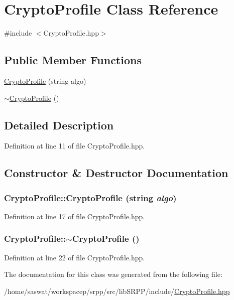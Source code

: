 \hypertarget{class_crypto_profile}{
\section{CryptoProfile Class Reference}
\label{class_crypto_profile}
}


{\ttfamily \#include $<$CryptoProfile.hpp$>$}

\subsection*{Public Member Functions}
\begin{DoxyCompactItemize}
\item 
\hyperlink{class_crypto_profile_aae84da171748b8b0e5ca71ebe8e9d94f}{CryptoProfile} (string algo)
\item 
\hyperlink{class_crypto_profile_a30bd26d43036962af26e70e5b32cc219}{$\sim$CryptoProfile} ()
\end{DoxyCompactItemize}


\subsection{Detailed Description}


Definition at line 11 of file CryptoProfile.hpp.



\subsection{Constructor \& Destructor Documentation}
\hypertarget{class_crypto_profile_aae84da171748b8b0e5ca71ebe8e9d94f}{
\subsubsection[{CryptoProfile}]{\setlength{\rightskip}{0pt plus 5cm}CryptoProfile::CryptoProfile (string {\em algo})}}
\label{class_crypto_profile_aae84da171748b8b0e5ca71ebe8e9d94f}


Definition at line 17 of file CryptoProfile.hpp.

\hypertarget{class_crypto_profile_a30bd26d43036962af26e70e5b32cc219}{
\subsubsection[{$\sim$CryptoProfile}]{\setlength{\rightskip}{0pt plus 5cm}CryptoProfile::$\sim$CryptoProfile ()}}
\label{class_crypto_profile_a30bd26d43036962af26e70e5b32cc219}


Definition at line 22 of file CryptoProfile.hpp.



The documentation for this class was generated from the following file:\begin{DoxyCompactItemize}
\item 
/home/saswat/workspacep/srpp/src/libSRPP/include/\hyperlink{_crypto_profile_8hpp}{CryptoProfile.hpp}\end{DoxyCompactItemize}
